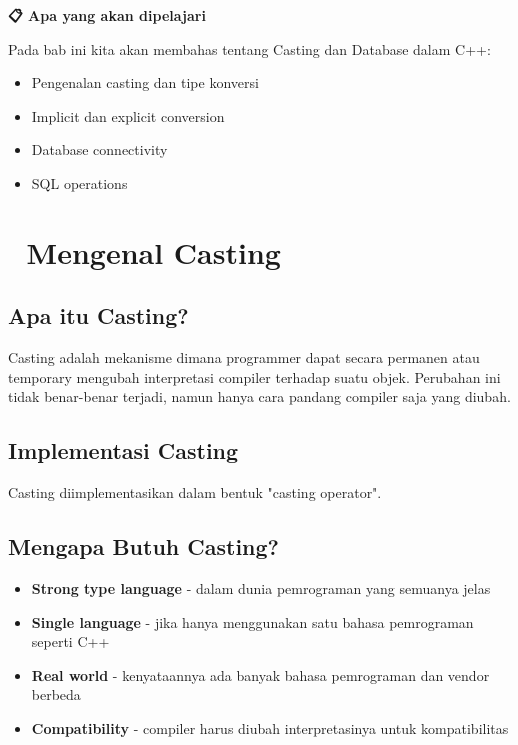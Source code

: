 \textbf{📋 Apa yang akan dipelajari}

Pada bab ini kita akan membahas tentang Casting dan Database dalam C++:

\begin{itemize}
\item Pengenalan casting dan tipe konversi
\item Implicit dan explicit conversion
\item Database connectivity
\item SQL operations
\end{itemize}

\minitoc

\section{🔄 Mengenal Casting}\label{mengenal-casting}

\subsection{Apa itu Casting?}

Casting adalah mekanisme dimana programmer dapat secara permanen atau temporary mengubah interpretasi compiler terhadap suatu objek. Perubahan ini tidak benar-benar terjadi, namun hanya cara pandang compiler saja yang diubah.

\subsection{Implementasi Casting}

Casting diimplementasikan dalam bentuk "casting operator".

\subsection{Mengapa Butuh Casting?}

\begin{itemize}
\item \textbf{Strong type language} - dalam dunia pemrograman yang semuanya jelas
\item \textbf{Single language} - jika hanya menggunakan satu bahasa pemrograman seperti C++
\item \textbf{Real world} - kenyataannya ada banyak bahasa pemrograman dan vendor berbeda
\item \textbf{Compatibility} - compiler harus diubah interpretasinya untuk kompatibilitas
\end{itemize}


